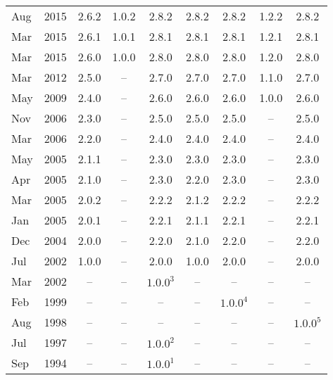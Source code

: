 \begin{xtabular}{|ll|c|c|c|c|c|c|c|}
Aug & 2015 & 2.6.2       & 1.0.2       & 2.8.2         & 2.8.2       & 2.8.2       & 1.2.2       & 2.8.2\\
Mar & 2015 & 2.6.1       & 1.0.1       & 2.8.1         & 2.8.1       & 2.8.1       & 1.2.1       & 2.8.1\\
Mar & 2015 & 2.6.0       & 1.0.0       & 2.8.0         & 2.8.0       & 2.8.0       & 1.2.0       & 2.8.0\\
Mar & 2012 & 2.5.0       & --          & 2.7.0         & 2.7.0       & 2.7.0       & 1.1.0       & 2.7.0\\
May & 2009 & 2.4.0       & --          & 2.6.0         & 2.6.0       & 2.6.0       & 1.0.0       & 2.6.0\\
Nov & 2006 & 2.3.0       & --          & 2.5.0         & 2.5.0       & 2.5.0       & --          & 2.5.0\\
Mar & 2006 & 2.2.0       & --          & 2.4.0         & 2.4.0       & 2.4.0       & --          & 2.4.0\\
May & 2005 & 2.1.1       & --          & 2.3.0         & 2.3.0       & 2.3.0       & --          & 2.3.0\\
Apr & 2005 & 2.1.0       & --          & 2.3.0         & 2.2.0       & 2.3.0       & --          & 2.3.0\\
Mar & 2005 & 2.0.2       & --          & 2.2.2         & 2.1.2       & 2.2.2       & --          & 2.2.2\\
Jan & 2005 & 2.0.1       & --          & 2.2.1         & 2.1.1       & 2.2.1       & --          & 2.2.1\\
Dec & 2004 & 2.0.0       & --          & 2.2.0         & 2.1.0       & 2.2.0       & --          & 2.2.0\\
Jul & 2002 & 1.0.0       & --          & 2.0.0         & 1.0.0       & 2.0.0       & --          & 2.0.0\\
Mar & 2002 & --          & --          & $1.0.0^3$     & --          & --          & --          & --\\
Feb & 1999 & --          & --          & --            & --          & $1.0.0^4$   & --          & --\\
Aug & 1998 & --          & --          & --            & --          & --          & --          & $1.0.0^5$\\
Jul & 1997 & --          & --          & $1.0.0^2$     & --          & --          & --          & --\\
Sep & 1994 & --          & --          & $1.0.0^1$     & --          & --          & --          & --\\
\end{xtabular}
